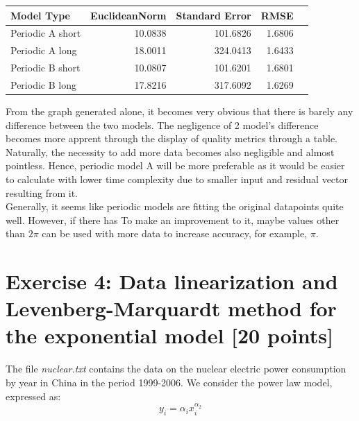 \documentclass[unicode,11pt,a4paper,oneside,numbers=endperiod,openany]{scrartcl}
\begin{document}
\begin{enumerate}[label=(\alph*)]
\begin{center}
\begin{tabular}{|l|r|r|r|r|} \hline
Model Type & EuclideanNorm & Standard Error & RMSE \\
\hline
  Periodic A short  & 10.0838 & 101.6826 & 1.6806\\
\hline
  Periodic A long & 18.0011 & 324.0413 & 1.6433\\
\hline
  Periodic B short  & 10.0807 & 101.6201 & 1.6801\\
\hline
  Periodic B long & 17.8216 & 317.6092 & 1.6269\\
\hline
\end{tabular}
\end{center}

\vspace{20px}

From the graph generated alone, it becomes very obvious that there is barely any difference between the two models. The negligence of 2 model's difference becomes more apprent through the display of quality metrics through a table. Naturally, the necessity to add more data becomes also negligible and almost pointless. Hence, periodic model A will be more preferable as it would be easier to calculate with lower time complexity due to smaller input and residual vector resulting from it. \\

Generally, it seems like periodic models are fitting the original datapoints quite well. However, if there has  To make an improvement to it, maybe values other than ${2\pi}$ can be used with more data to increase accuracy, for example, ${\pi}$.

\end{enumerate}

\section*{Exercise 4: Data linearization and Levenberg-Marquardt method for the exponential model [20 points]}
\vspace{20px}
The file \textit{nuclear.txt} contains the data on the nuclear electric power consumption by year in China in the period
1999-2006. We consider the power law model, expressed as: \\

\begin{equation}
y_i = \alpha_ix_i^{\alpha_2}
\end{equation}

\vspace{20px}
\end{document}
